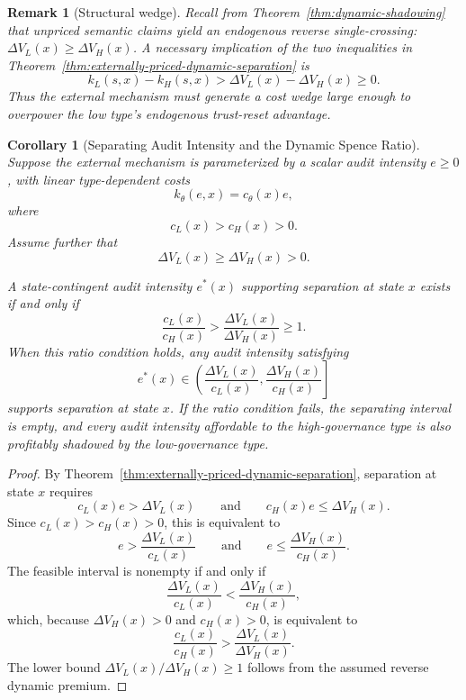 \documentclass[review,authoryear]{elsarticle}
\newtheorem{corollary}{Corollary}
\newtheorem{remark}{Remark}
\theoremstyle{definition}
\theoremstyle{plain}
\begin{document}
\begin{remark}[Structural wedge]
\label{rem:dynamic-structural-wedge}
Recall from Theorem~\ref{thm:dynamic-shadowing} that unpriced semantic claims
yield an endogenous reverse single-crossing: $\Delta V_L(x)\ge\Delta V_H(x)$.
A necessary implication of the two inequalities in
Theorem~\ref{thm:externally-priced-dynamic-separation} is
\[
k_L(s,x)-k_H(s,x)
>
\Delta V_L(x)-\Delta V_H(x)\ge 0.
\]
Thus the external mechanism must generate a cost wedge large enough to
overpower the low type's endogenous trust-reset advantage.
\end{remark}

\begin{corollary}[Separating Audit Intensity and the Dynamic Spence Ratio]
\label{cor:dynamic-spence-ratio}
Suppose the external mechanism is parameterized by a scalar audit intensity
$e\ge 0$, with linear type-dependent costs
\[
k_\theta(e,x)=c_\theta(x)e,
\]
where
\[
c_L(x)>c_H(x)>0.
\]
Assume further that
\[
\Delta V_L(x)\ge \Delta V_H(x)>0.
\]

A state-contingent audit intensity $e^*(x)$ supporting separation at state
$x$ exists if and only if
\[
\frac{c_L(x)}{c_H(x)}
>
\frac{\Delta V_L(x)}{\Delta V_H(x)}
\ge 1.
\]
When this ratio condition holds, any audit intensity satisfying
\[
e^*(x)\in
\left(
\frac{\Delta V_L(x)}{c_L(x)},
\frac{\Delta V_H(x)}{c_H(x)}
\right]
\]
supports separation at state $x$. If the ratio condition fails, the
separating interval is empty, and every audit intensity affordable to the
high-governance type is also profitably shadowed by the low-governance type.
\end{corollary}
\begin{proof}
By Theorem~\ref{thm:externally-priced-dynamic-separation}, separation at
state $x$ requires
\[
c_L(x)e>\Delta V_L(x)
\qquad\text{and}\qquad
c_H(x)e\le\Delta V_H(x).
\]
Since $c_L(x)>c_H(x)>0$, this is equivalent to
\[
e>
\frac{\Delta V_L(x)}{c_L(x)}
\qquad\text{and}\qquad
e\le
\frac{\Delta V_H(x)}{c_H(x)}.
\]
The feasible interval is nonempty if and only if
\[
\frac{\Delta V_L(x)}{c_L(x)}
<
\frac{\Delta V_H(x)}{c_H(x)},
\]
which, because $\Delta V_H(x)>0$ and $c_H(x)>0$, is equivalent to
\[
\frac{c_L(x)}{c_H(x)}
>
\frac{\Delta V_L(x)}{\Delta V_H(x)}.
\]
The lower bound $\Delta V_L(x)/\Delta V_H(x)\ge1$ follows from the assumed
reverse dynamic premium.
\end{proof}
\end{document}
